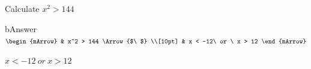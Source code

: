 \begin{mtask}
    \task Calculate $ x^2 > 144$
              \begin{envOut}[equal height group=A-Rev-1]{bAnswer}
			       $\begin{mArrow}
			             & x^2 > 144      \Arrow{$\ $} \\[10pt]
                         & x < -12\ or \ x > 12	   
	                \end{mArrow}$
              \end{envOut}			  
			  \begin{exercise}\begin{shortsolution}  
				       $ x  < -12 \ or \ x > 12$
			  \end{shortsolution}\end{exercise}					  
\end{mtask}

\clearpage
\printshortsolutions
\clearpage



